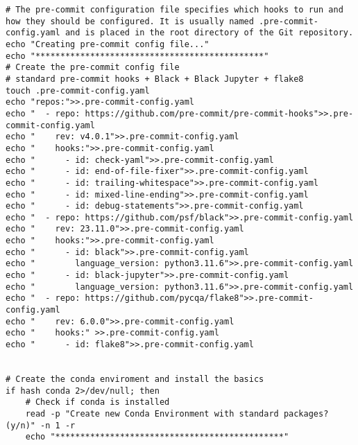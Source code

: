 \documentclass[12pt,a4paper]{article}
\begin{document}
\begin{lstlisting}
# The pre-commit configuration file specifies which hooks to run and how they should be configured. It is usually named .pre-commit-config.yaml and is placed in the root directory of the Git repository.
echo "Creating pre-commit config file..."
echo "**********************************************"
# Create the pre-commit config file
# standard pre-commit hooks + Black + Black Jupyter + flake8
touch .pre-commit-config.yaml
echo "repos:">>.pre-commit-config.yaml
echo "  - repo: https://github.com/pre-commit/pre-commit-hooks">>.pre-commit-config.yaml
echo "    rev: v4.0.1">>.pre-commit-config.yaml
echo "    hooks:">>.pre-commit-config.yaml
echo "      - id: check-yaml">>.pre-commit-config.yaml
echo "      - id: end-of-file-fixer">>.pre-commit-config.yaml
echo "      - id: trailing-whitespace">>.pre-commit-config.yaml
echo "      - id: mixed-line-ending">>.pre-commit-config.yaml
echo "      - id: debug-statements">>.pre-commit-config.yaml
echo "  - repo: https://github.com/psf/black">>.pre-commit-config.yaml
echo "    rev: 23.11.0">>.pre-commit-config.yaml
echo "    hooks:">>.pre-commit-config.yaml
echo "      - id: black">>.pre-commit-config.yaml
echo "        language_version: python3.11.6">>.pre-commit-config.yaml
echo "      - id: black-jupyter">>.pre-commit-config.yaml
echo "        language_version: python3.11.6">>.pre-commit-config.yaml
echo "  - repo: https://github.com/pycqa/flake8">>.pre-commit-config.yaml
echo "    rev: 6.0.0">>.pre-commit-config.yaml
echo "    hooks:" >>.pre-commit-config.yaml
echo "      - id: flake8">>.pre-commit-config.yaml


# Create the conda enviroment and install the basics
if hash conda 2>/dev/null; then
    # Check if conda is installed
    read -p "Create new Conda Environment with standard packages? (y/n)" -n 1 -r
    echo "**********************************************"


\end{lstlisting}
\end{document}
